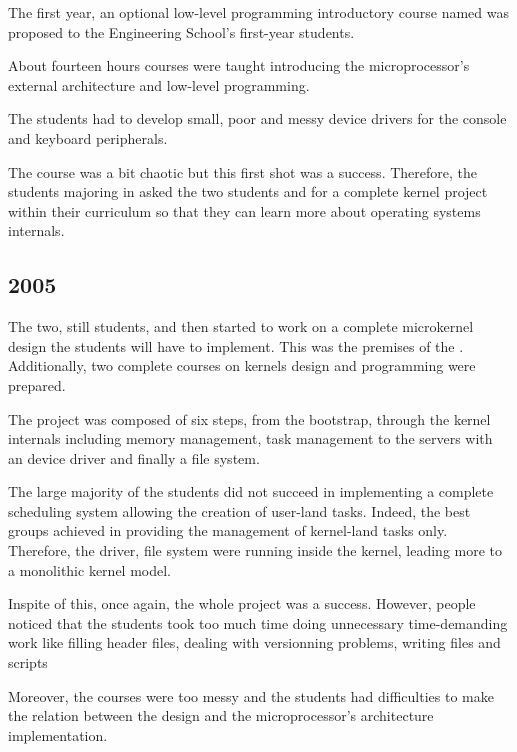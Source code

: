 \begin{multicols}{2}
The first year, an optional low-level programming introductory course named
 was proposed to the  Engineering School's first-year
students.

About fourteen hours courses were taught introducing the 
microprocessor's external architecture and low-level programming.

The students had to develop small, poor and messy device drivers for the
console and keyboard peripherals.

The course was a bit chaotic but this first shot was a success. Therefore, the
students majoring in  asked the two
students  and  for a
complete kernel project within their curriculum so that they can learn more
about operating systems internals.

%
%

\subsection{2005}

The two, still students,  and  then started to work on a complete microkernel design the students
will have to implement. This was the premises of the . Additionally, two complete courses on
kernels design and  programming were prepared.

The project was composed of six steps, from the bootstrap, through the
kernel internals including memory management, task management \etc{}
to the servers with an  device driver and finally a 
file system.

The large majority of the students did not succeed in implementing a
complete scheduling system allowing the creation of user-land tasks. Indeed,
the best groups achieved in providing the management of kernel-land tasks only.
Therefore, the  driver,  file system \etc{} were
running inside the kernel, leading more to a monolithic kernel model.

Inspite of this, once again, the whole project was a success. However,
 people noticed that the students took too much time doing
unnecessary time-demanding work like filling header files, dealing with
versionning problems, writing  files and  scripts \etc{}

Moreover, the courses were too messy and the students had difficulties
to make the relation between the  design and the microprocessor's
architecture implementation.


\end{multicols}
